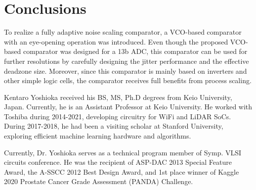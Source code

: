 \documentclass[letterpaper, 10 pt, conference]{ieeeconf}  %
\begin{document}
\section{Conclusions}
To realize a fully adaptive noise scaling comparator, a VCO-based comparator with an eye-opening operation was introduced.  Even though the proposed VCO-based comparator was designed for a 13b ADC, this comparator can be used for further resolutions by carefully designing the jitter performance and the effective deadzone size. Moreover, since this comparator is mainly based on inverters and other simple logic cells, the comparator receives full benefits from process scaling. %





\begin{IEEEbiography}
{Kentaro Yoshioka}
received his BS, MS, Ph.D degrees from Keio University, Japan. Currently, he is an Assistant Professor at Keio University. He worked with Toshiba during 2014-2021, developing circuitry for WiFi and LiDAR SoCs. During 2017-2018, he had been a visiting scholar at Stanford University, exploring efficient machine learning hardware and algorithms. 

Currently, Dr. Yoshioka serves as a technical program member of Symp. VLSI circuits conference. He was the recipient of ASP-DAC 2013 Special Feature Award, the A-SSCC 2012 Best Design Award, and 1st place winner of Kaggle 2020 Prostate Cancer Grade Assessment (PANDA) Challenge.
\end{IEEEbiography}
\end{document}
